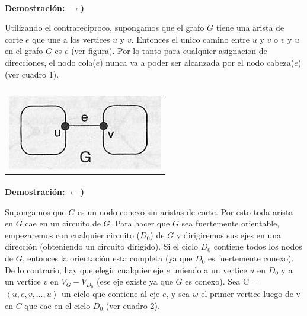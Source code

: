 \paragraph{} 
\textbf{Demostración:} \underline{\textbf{$\rightarrow$)}}

Utilizando el contrareciproco, supongamos que el grafo $G$ tiene una arista de corte $e$ que une a los vertices $u$ y $v$. Entonces el unico camino entre $u$ y $v$  o $v$ y $u$ en el grafo $G$ es $e$ (ver figura). Por lo tanto para cualquier asignacion de direcciones, el nodo cola($e$) nunca va a poder ser alcanzada por el nodo cabeza($e$) (ver cuadro 1).

	\begin{table}[h!] %
		\centering %
			\begin{tabular}{c}
				\includegraphics[scale=0.7]{./otros/figura1.jpg} 

				\end{tabular}
				\caption{} %
				\label{} %
	\end{table}

\paragraph{} 
\textbf{Demostración:} \underline{\textbf{$\leftarrow$)}}

Supongamos que $G$ es un nodo conexo sin aristas de corte. Por esto toda arista en $G$ cae en un circuito de $G$.
Para hacer que $G$ sea fuertemente orientable, empezaremos con cualquier circuito ($D_0$) de $G$ y dirigiremos sus ejes en una dirección (obteniendo un circuito dirigido). Si el ciclo $D_0$ contiene todos los nodos de $G$, entonces la orientación esta completa (ya que $D_0$ es fuertemente conexo). De lo contrario, hay que elegir cualquier eje $e$ uniendo a un vertice $u$ en $D_0$ y a un vertice $v$ en $V_G - V_{D_0}$ (ese eje existe ya que $G$ es conexo). Sea C = $\left\langle u,e,v,...,u  \right\rangle$ un ciclo que contiene al eje $e$, y sea $w$ el primer vertice luego de v en $C$ que cae en el ciclo $D_0$ (ver cuadro 2).


